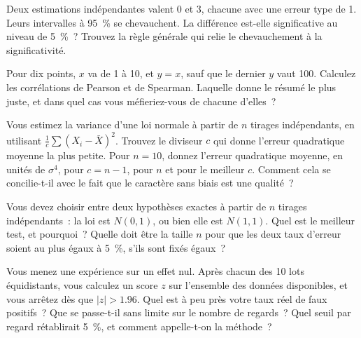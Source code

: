 \begin{question}\label{iq:iv1:statistics:25}
Deux estimations indépendantes valent 0 et 3, chacune avec une erreur type de 1. Leurs intervalles à 95~\% se chevauchent. La différence est-elle significative au niveau de 5~\%~? Trouvez la règle générale qui relie le chevauchement à la significativité.
\end{question}

\begin{question}\label{iq:iv1:statistics:26}
Pour dix points, $x$ va de 1 à 10, et $y = x$, sauf que le dernier $y$ vaut 100. Calculez les corrélations de Pearson et de Spearman. Laquelle donne le résumé le plus juste, et dans quel cas vous méfieriez-vous de chacune d'elles~?
\end{question}

\begin{question}\label{iq:iv1:statistics:27}
Vous estimez la variance d'une loi normale à partir de $n$ tirages indépendants, en utilisant $\frac{1}{c}\sum (X_i - \bar{X})^2$. Trouvez le diviseur $c$ qui donne l'erreur quadratique moyenne la plus petite. Pour $n = 10$, donnez l'erreur quadratique moyenne, en unités de $\sigma^4$, pour $c = n - 1$, pour $n$ et pour le meilleur $c$. Comment cela se concilie-t-il avec le fait que le caractère sans biais est une qualité~?
\end{question}

\begin{question}\label{iq:iv1:statistics:28}
Vous devez choisir entre deux hypothèses exactes à partir de $n$ tirages indépendants~: la loi est $N(0, 1)$, ou bien elle est $N(1, 1)$. Quel est le meilleur test, et pourquoi~? Quelle doit être la taille $n$ pour que les deux taux d'erreur soient au plus égaux à 5~\%, s'ils sont fixés égaux~?
\end{question}

\begin{question}\label{iq:iv1:statistics:29}
Vous menez une expérience sur un effet nul. Après chacun des 10 lots équidistants, vous calculez un score $z$ sur l'ensemble des données disponibles, et vous arrêtez dès que $|z| > 1.96$. Quel est à peu près votre taux réel de faux positifs~? Que se passe-t-il sans limite sur le nombre de regards~? Quel seuil par regard rétablirait 5~\%, et comment appelle-t-on la méthode~?
\end{question}

